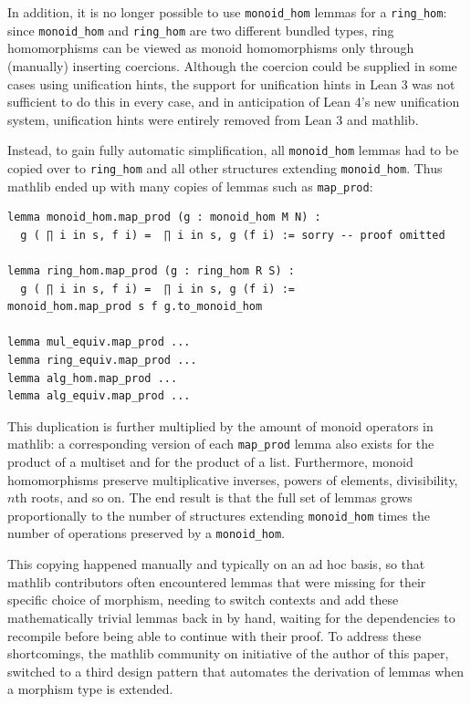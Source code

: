 \documentclass[a4paper,UKenglish,cleveref, autoref, thm-restate]{lipics-v2021}
\newcommand{\mathlib}{\textsf{mathlib}\xspace}
\begin{document}
In addition, it is no longer possible to use \lstinline{monoid_hom} lemmas for a \mbox{\lstinline{ring_hom}:}
since \lstinline{monoid_hom} and \lstinline{ring_hom} are two different bundled types,
ring homomorphisms can be viewed as monoid homomorphisms only through (manually) inserting coercions.
Although the coercion could be supplied in some cases using unification hints, the support for unification hints in Lean 3 was not sufficient to do this in every case,
and in anticipation of Lean 4's new unification system, unification hints were entirely removed from Lean 3 and \mathlib.

Instead, to gain fully automatic simplification, all \lstinline{monoid_hom} lemmas had to be copied over to \lstinline{ring_hom} and all other structures extending \lstinline{monoid_hom}.
Thus \mathlib ended up with many copies of lemmas such as \lstinline{map_prod}:
\begin{lstlisting}
lemma monoid_hom.map_prod (g : monoid_hom M N) :
  g ( ∏ i in s, f i) =  ∏ i in s, g (f i) := sorry -- proof omitted

lemma ring_hom.map_prod (g : ring_hom R S) :
  g ( ∏ i in s, f i) =  ∏ i in s, g (f i) :=
monoid_hom.map_prod s f g.to_monoid_hom

lemma mul_equiv.map_prod ...
lemma ring_equiv.map_prod ...
lemma alg_hom.map_prod ...
lemma alg_equiv.map_prod ...
\end{lstlisting}
This duplication is further multiplied by the amount of monoid operators in \mathlib:
a corresponding version of each \lstinline{map_prod} lemma also exists for the product of a multiset and for the product of a list.
Furthermore, monoid homomorphisms preserve multiplicative inverses, powers of elements, divisibility, $n$th roots, and so on.
The end result is that the full set of lemmas grows proportionally to the number of structures extending \lstinline{monoid_hom} times the number of operations preserved by a \lstinline{monoid_hom}.

This copying happened manually and typically on an ad hoc basis, so that \mathlib contributors often encountered lemmas that were missing for their specific choice of morphism,
needing to switch contexts and add these mathematically trivial lemmas back in by hand, waiting for the dependencies to recompile before being able to continue with their proof.
To address these shortcomings, the \mathlib community on initiative of the author of this paper, switched to a third design pattern that automates the derivation of lemmas when a morphism type is extended.
\end{document}
